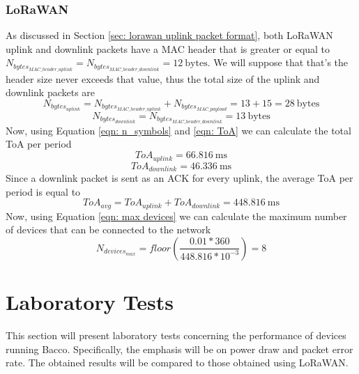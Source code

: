 \subsubsection{LoRaWAN}
As discussed in Section \ref{sec: lorawan uplink packet format}, both LoRaWAN uplink and downlink packets have a
\gls{MAC}
header that is greater or equal to $\mathit{N_{bytes_{MAC\_header\_uplink}}} = \mathit{N_{bytes_{MAC\_header\_downlink}}}
= 12\ \mathrm{bytes}$. We will suppose that that's the header size never exceeds that value, thus the total size of the
uplink and downlink packets are
$$\mathit{N_{bytes_{uplink}}} = \mathit{N_{bytes_{MAC\_header\_uplink}}} + \mathit{N_{bytes_{MAC\_payload}}} = 13 + 15 =
28\ \mathrm{bytes}$$
$$\mathit{N_{bytes_{downlink}}} = \mathit{N_{bytes_{MAC\_header\_downlink}}} = 13\ \mathrm{bytes}$$
Now, using Equation \ref{eqn: n_symbols} and \ref{eqn: ToA} we can calculate the total \gls{ToA} per period
$$\mathit{ToA_{uplink}} = 66.816\ \mathrm{ms}$$
$$\mathit{ToA_{downlink}} = 46.336\ \mathrm{ms} $$
Since a downlink packet is sent as an \gls{ACK} for every uplink, the average \gls{ToA} per period is equal to
$$\mathit{ToA_{avg}} = \mathit{ToA_{uplink}} + \mathit{ToA_{downlink}} = 448.816\ \mathrm{ms} $$
Now, using Equation \ref{eqn: max devices} we can calculate the maximum number of devices that can be connected to the
network
$$\mathit{N_{devices_{max}}} = \textit{floor} \left( \frac{0.01 * 360}{448.816 * 10^{-3}} \right) = 8$$

\section{Laboratory Tests}
This section will present laboratory tests concerning the performance of devices running Bacco. Specifically, the
emphasis will be on power draw and packet error rate. The obtained results will be compared to those obtained using
LoRaWAN.

